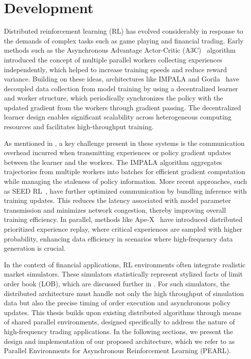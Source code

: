 \chapter{Development}
\label{ch:development}

Distributed reinforcement learning (RL) has evolved considerably in response to the demands of complex tasks such as game playing and financial trading.
Early methods such as the Asynchronous Advantage Actor-Critic (A3C)~\citep{Mnih2016}
algorithm introduced the concept of multiple parallel workers collecting experiences independently,
which helped to increase training speeds and reduce reward variance.
Building on these ideas, architectures like IMPALA and Gorila~\citep{Espeholt2018,Nair2015} 
have decoupled data collection from model training by using
a decentralized learner and worker structure, which periodically synchronizes the policy with the updated gradient
from the workers through gradient passing.
The decentralized learner design enables significant scalability across heterogeneous 
computing resources and facilitates high-throughput training.

As mentioned in , a key challenge present in these systems is the 
communication overhead incurred when transmitting experiences or
policy gradient updates between the learner and the workers.
The IMPALA algorithm aggregates trajectories from multiple workers into
batches for efficient gradient computation while managing the staleness of policy information.
More recent approaches, such as SEED RL~\citep{Espeholt2020}, 
have further optimized communication by bundling inference with training updates.
This reduces the latency associated with model parameter transmission and minimizes network congestion, 
thereby improving overall training efficiency.
In parallel, methods like Ape-X~\citep{Horgan2018} have introduced distributed prioritized experience replay, 
where critical experiences are sampled with higher probability,
enhancing data efficiency in scenarios where high-frequency data generation is crucial.

In the context of financial applications, RL environments often integrate realistic market simulators.
These simulators statistically represent stylized facts of limit order book (LOB), which are discussed
further in .
For such simulators, the distributed architecture must handle not only the high throughput of simulation data but also the
precise timing of order execution and asynchronous policy updates.
This thesis builds upon existing distributed algorithms through means of shared parallel environments,
designed specifically to address the nature of high-frequency trading applications.
In the following sections, we present the design and implementation of our proposed architecture,
which we refer to as Parallel Environments for Asynchronous Reinforcement Learning (PEARL).

